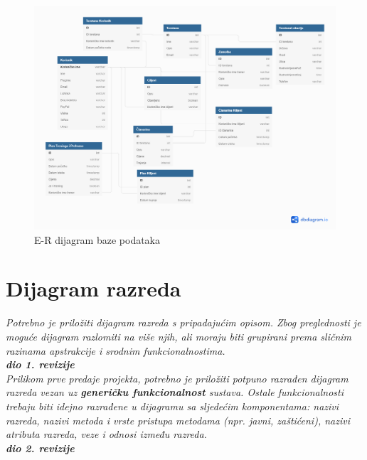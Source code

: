 				\begin{figure}[H]
					\hspace*{-1.5cm}
					\includegraphics[scale=0.4]{dijagrami/dijagram_baze_podataka.PNG} %
					\centering
					\caption{E-R dijagram baze podataka}
					\label{fig:promjene}
				\end{figure}
			
			\eject
			
			
		\section{Dijagram razreda}
		
			\textit{Potrebno je priložiti dijagram razreda s pripadajućim opisom. Zbog preglednosti je moguće dijagram razlomiti na više njih, ali moraju biti grupirani prema sličnim razinama apstrakcije i srodnim funkcionalnostima.}\\
			
			\textbf{\textit{dio 1. revizije}}\\
			
			\textit{Prilikom prve predaje projekta, potrebno je priložiti potpuno razrađen dijagram razreda vezan uz \textbf{generičku funkcionalnost} sustava. Ostale funkcionalnosti trebaju biti idejno razrađene u dijagramu sa sljedećim komponentama: nazivi razreda, nazivi metoda i vrste pristupa metodama (npr. javni, zaštićeni), nazivi atributa razreda, veze i odnosi između razreda.}\\
			
			\textbf{\textit{dio 2. revizije}}\\			
			
